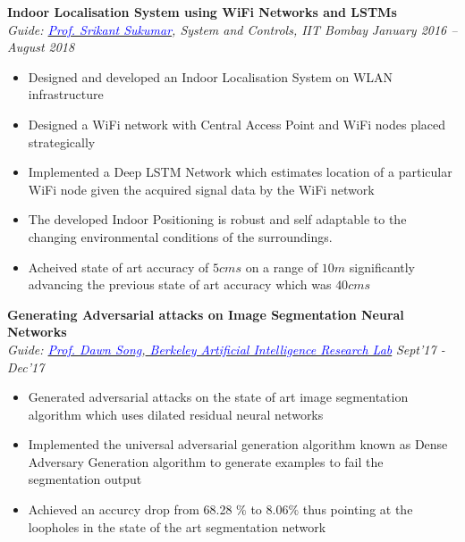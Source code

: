 \documentclass[margin,line]{res}
\newenvironment{list1}{
  \begin{list}{\ding{113}}{%
      \setlength{\itemsep}{0in}
      \setlength{\parsep}{0in} \setlength{\parskip}{0in}
      \setlength{\topsep}{0in} \setlength{\partopsep}{0in} 
      \setlength{\leftmargin}{0.17in}}}{\end{list}}
\begin{document}
\begin{resume}
{\bf Indoor Localisation System using WiFi Networks and LSTMs} \\
{\em Guide: \href{http://www.sc.iitb.ac.in/~srikant/dokuwiki/doku.php}{\textcolor{blue}{Prof. Srikant Sukumar}}, System and Controls, IIT Bombay} \hfill{\it January 2016 -- August 2018} \\
\vspace*{-.13in}
\begin{itemize}
\item Designed and developed an Indoor Localisation System on WLAN infrastructure
\item Designed a WiFi network with Central Access Point and WiFi nodes placed strategically 
\item Implemented a Deep LSTM Network which estimates location of a particular WiFi node given the acquired signal data by the WiFi network
\item The developed Indoor Positioning is robust and self adaptable to the changing environmental conditions of the surroundings.
\item Acheived state of art accuracy of $5 cms$ on a range of $10 m$ significantly advancing the previous state of art accuracy which was $40 cms$ \\ 
\end{itemize}


{\bf Generating Adversarial attacks on Image Segmentation Neural Networks} \\
{\em Guide: \href{https://people.eecs.berkeley.edu/~dawnsong/}{\textcolor{blue}{Prof. Dawn Song}},\href{https://bair.berkeley.edu}{\textcolor{blue}{ Berkeley Artificial Intelligence Research Lab}}} \hfill {\it Sept'17 - Dec'17}\\
\vspace*{-.13in}
\begin{itemize}
\item Generated adversarial attacks on the state of art image segmentation algorithm which uses dilated residual neural networks
\item Implemented the universal adversarial generation algorithm known as Dense Adversary Generation algorithm to generate examples to fail the segmentation output 
\item Achieved an accurcy drop from 68.28 $\%$ to 8.06$\%$ thus pointing at the loopholes in the state of the art segmentation network
\end{itemize}


\end{resume}
\end{document}
